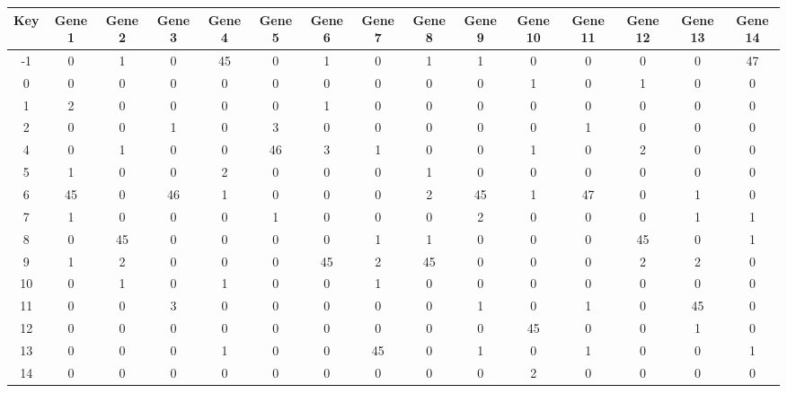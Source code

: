 \begin{tabular}{|c|c|c|c|c|c|c|c|c|c|c|c|c|c|c|}
\hline
Key & Gene 1 & Gene 2 & Gene 3 & Gene 4 & Gene 5 & Gene 6 & Gene 7 & Gene 8 & Gene 9 & Gene 10 & Gene 11 & Gene 12 & Gene 13 & Gene 14 \\
\hline
-1 & 0 & 1 & 0 & 45 & 0 & 1 & 0 & 1 & 1 & 0 & 0 & 0 & 0 & 47 \\
0 & 0 & 0 & 0 & 0 & 0 & 0 & 0 & 0 & 0 & 1 & 0 & 1 & 0 & 0 \\
1 & 2 & 0 & 0 & 0 & 0 & 1 & 0 & 0 & 0 & 0 & 0 & 0 & 0 & 0 \\
2 & 0 & 0 & 1 & 0 & 3 & 0 & 0 & 0 & 0 & 0 & 1 & 0 & 0 & 0 \\
4 & 0 & 1 & 0 & 0 & 46 & 3 & 1 & 0 & 0 & 1 & 0 & 2 & 0 & 0 \\
5 & 1 & 0 & 0 & 2 & 0 & 0 & 0 & 1 & 0 & 0 & 0 & 0 & 0 & 0 \\
6 & 45 & 0 & 46 & 1 & 0 & 0 & 0 & 2 & 45 & 1 & 47 & 0 & 1 & 0 \\
7 & 1 & 0 & 0 & 0 & 1 & 0 & 0 & 0 & 2 & 0 & 0 & 0 & 1 & 1 \\
8 & 0 & 45 & 0 & 0 & 0 & 0 & 1 & 1 & 0 & 0 & 0 & 45 & 0 & 1 \\
9 & 1 & 2 & 0 & 0 & 0 & 45 & 2 & 45 & 0 & 0 & 0 & 2 & 2 & 0 \\
10 & 0 & 1 & 0 & 1 & 0 & 0 & 1 & 0 & 0 & 0 & 0 & 0 & 0 & 0 \\
11 & 0 & 0 & 3 & 0 & 0 & 0 & 0 & 0 & 1 & 0 & 1 & 0 & 45 & 0 \\
12 & 0 & 0 & 0 & 0 & 0 & 0 & 0 & 0 & 0 & 45 & 0 & 0 & 1 & 0 \\
13 & 0 & 0 & 0 & 1 & 0 & 0 & 45 & 0 & 1 & 0 & 1 & 0 & 0 & 1 \\
14 & 0 & 0 & 0 & 0 & 0 & 0 & 0 & 0 & 0 & 2 & 0 & 0 & 0 & 0 \\
\hline
\end{tabular}
